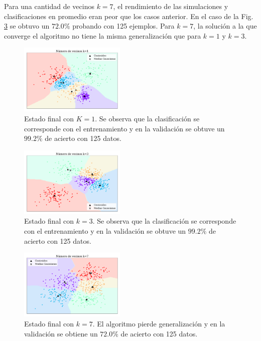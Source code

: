 
    Para una cantidad de vecinos $k=7$, el rendimiento de las  simulaciones y clasificaciones en promedio eran peor que los casos anterior. En el caso de la Fig.\,\ref{fig:ejer4_k_7} se obtuvo un $72.0\%$ probando con 125 ejemplos. Para $k=7$, la solución a la que converge el algoritmo no tiene la misma generalización que para $k=1$ y $k=3$.


\begin{figure}[H]
    \centering
    \includegraphics[width=0.45\textwidth]{plots/ejer_4_K-1_si_converge.pdf}
    \caption{Estado final con $K=1$. Se observa que la clasificación se corresponde con el entrenamiento y en la validación se obtuve un $99.2\%$ de acierto con 125 datos.}
    \label{fig:ejer4_k_1}
\end{figure} 

\begin{figure}[H]
    \centering
    \includegraphics[width=0.45\textwidth]{plots/ejer_4_K-3_si_converge.pdf}
    \caption{Estado final con $k=3$. Se observa que la clasificación se corresponde con el entrenamiento y en la validación se obtuve un $99.2\%$ de acierto con 125 datos.}
    \label{fig:ejer4_k_3}
\end{figure} 

\begin{figure}[H]
    \centering
    \includegraphics[width=0.45\textwidth]{plots/ejer_4_K-7_si_converge.pdf}
    \caption{Estado final con $k=7$. El algoritmo pierde generalización y en la validación se obtiene un $72.0\%$ de acierto con 125 datos. }
    \label{fig:ejer4_k_7}
\end{figure} 
    

